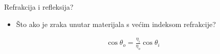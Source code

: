 \documentclass[9pt]{beamer}
\begin{document}
\begin{frame}{Refrakcija i refleksija?}
	\begin{itemize}
		\item Što ako je zraka unutar materijala s većim indeksom refrakcije?
	\end{itemize}
	\begin{align*}
		\cos \theta_o = \frac{\eta_i}{\eta_o} \cos \theta_i
	\end{align*}
\end{frame}
%
%
\end{document}
